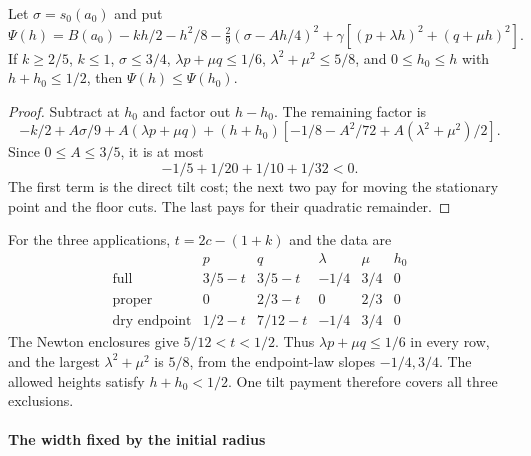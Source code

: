 \begin{lemma}\label{lem:triangle-tilt-payment}
Let $\sigma=s_0(a_0)$ and put
\[
 \Psi(h)=B(a_0)-kh/2-h^2/8-\tfrac29(\sigma-Ah/4)^2
       +\gamma[(p+\lambda h)^2+(q+\mu h)^2].
\]
If $k\ge2/5$, $k\le1$, $\sigma\le3/4$,
$\lambda p+\mu q\le1/6$, $\lambda^2+\mu^2\le5/8$, and
$0\le h_0\le h$ with $h+h_0\le1/2$, then $\Psi(h)\le\Psi(h_0)$.
\end{lemma}
\begin{proof}
Subtract at $h_0$ and factor out $h-h_0$. The remaining factor is
\[
 -k/2+A\sigma/9+A(\lambda p+\mu q)
 +(h+h_0)[-1/8-A^2/72+A(\lambda^2+\mu^2)/2].
\]
Since $0\le A\le3/5$, it is at most
\[
 -1/5+1/20+1/10+1/32<0.
\]
The first term is the direct tilt cost; the next two pay for
moving the stationary point and the floor cuts. The last pays
for their quadratic remainder.
\end{proof}

For the three applications, $t=2c-(1+k)$ and the data are
\[
\begin{array}{c|cccc|c}
 &p&q&\lambda&\mu&h_0\\ \hline
 \text{full}&3/5-t&3/5-t&-1/4&3/4&0\\
 \text{proper}&0&2/3-t&0&2/3&0\\
 \text{dry endpoint}&1/2-t&7/12-t&-1/4&3/4&0
\end{array}
\]
The Newton enclosures give $5/12<t<1/2$.
Thus $\lambda p+\mu q\le1/6$ in every row, and the largest
$\lambda^2+\mu^2$ is $5/8$, from the endpoint-law slopes
$-1/4,3/4$. The allowed heights satisfy $h+h_0<1/2$.
One tilt payment therefore covers all three exclusions.

\paragraph{The width fixed by the initial radius}

